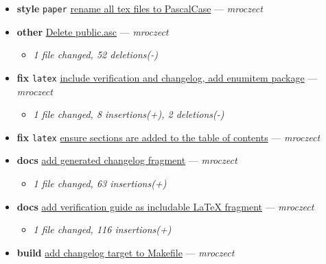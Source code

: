 \begin{itemize}[leftmargin=1.5em]
  \item \textbf{style} \texttt{paper} \href{https://github.com/mroczect/mroczect.github.io/commit/b89528972d635c9be3afb604c556cf162b1e6ddf}{rename all tex files to PascalCase} --- \textit{mroczect}
  \item \textbf{other} \href{https://github.com/mroczect/mroczect.github.io/commit/fb02822bfc1fd94f9308498dd2b1abc00fcf2256}{Delete public.asc} --- \textit{mroczect}
  \begin{itemize}[leftmargin=1.5em]
    \item \small\textit{1 file changed, 52 deletions(-)}
  \end{itemize}
  \item \textbf{fix} \texttt{latex} \href{https://github.com/mroczect/mroczect.github.io/commit/0d0e1d3cd9ba75197f71767b24dd5be811615853}{include verification and changelog, add enumitem package} --- \textit{mroczect}
  \begin{itemize}[leftmargin=1.5em]
    \item \small\textit{1 file changed, 8 insertions(+), 2 deletions(-)}
  \end{itemize}
  \item \textbf{fix} \texttt{latex} \href{https://github.com/mroczect/mroczect.github.io/commit/4039381679395bd77b74273e795954d4e33ef343}{ensure sections are added to the table of contents} --- \textit{mroczect}
  \item \textbf{docs} \href{https://github.com/mroczect/mroczect.github.io/commit/90256cc1968f35da386bbff7d70b3386219f8254}{add generated changelog fragment} --- \textit{mroczect}
  \begin{itemize}[leftmargin=1.5em]
    \item \small\textit{1 file changed, 63 insertions(+)}
  \end{itemize}
  \item \textbf{docs} \href{https://github.com/mroczect/mroczect.github.io/commit/aa0476679993ac479fd1070ebd26ad47120ea2b6}{add verification guide as includable LaTeX fragment} --- \textit{mroczect}
  \begin{itemize}[leftmargin=1.5em]
    \item \small\textit{1 file changed, 116 insertions(+)}
  \end{itemize}
  \item \textbf{build} \href{https://github.com/mroczect/mroczect.github.io/commit/aa33046ffb53e498916d8aad3aed477744aa9a26}{add changelog target to Makefile} --- \textit{mroczect}
  \begin{itemize}[leftmargin=1.5em]

\end{itemize}
\end{itemize}

